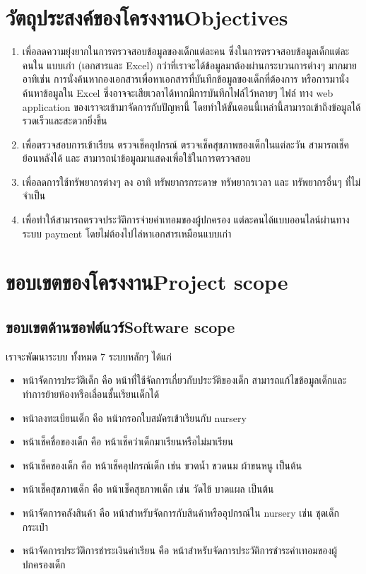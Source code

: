 \section{\ifcpe วัตถุประสงค์ของโครงงาน\else Objectives\fi}
\begin{enumerate}
    \item เพื่อลดความยุ่งยากในการตรวจสอบข้อมูลของเด็กแต่ละคน ซึ่งในการตรวจสอบข้อมูลเด็กแต่ละคนใน แบบเก่า (เอกสารและ Excel) กว่าที่เราจะได้ข้อมูลมาต้องผ่านกระบวนการต่างๆ มากมาย อาทิเช่น การนั่งค้นหากองเอกสารเพื่อหาเอกสารที่บันทึกข้อมูลของเด็กที่ต้องการ หรือการมานั่งค้นหาข้อมูลใน Excel ซึ่งอาจจะเสียเวลาได้หากมีการบันทึกไฟล์ไว้หลายๆ ไฟล์ ทาง web application ของเราจะเข้ามาจัดการกับปัญหานี้ โดยทําให้ขั้นตอนนี้เหล่านี้สามารถเข้าถึงข้อมูลได้รวดเร็วและสะดวกยิ่งขึ้น 

    \item เพื่อตรวจสอบการเข้าเรียน ตรวจเช็คอุปกรณ์ ตรวจเช็คสุขภาพของเด็กในแต่ละวัน   สามารถเช็คย้อนหลังได้ และ สามารถนําข้อมูลมาแสดงเพื่อใช้ในการตรวจสอบ

    \item เพื่อลดการใช้ทรัพยากรต่างๆ ลง อาทิ ทรัพยากรกระดาษ ทรัพยากรเวลา และ ทรัพยากรอื่นๆ ที่ไม่จําเป็น
    \item เพื่อทำให้สามารถตรวจประวัติการจ่ายค่าเทอมของผู้ปกครอง แต่ละคนได้แบบออนไลน์ผ่านทางระบบ payment โดยไม่ต้องไปไล่หาเอกสารเหมือนแบบเก่า

\end{enumerate}


\section{\ifcpe ขอบเขตของโครงงาน\else Project scope\fi}




\subsection{\ifcpe ขอบเขตด้านซอฟต์แวร์\else Software scope\fi}
    เราจะพัฒนาระบบ ทั้งหมด 7 ระบบหลักๆ ได้แก่
    \begin{itemize}
        \item หน้าจัดการประวัติเด็ก คือ หน้าที่ใช้จัดการเกี่ยวกับประวัติของเด็ก สามารถแก้ไขข้อมูลเด็กและทำการย้ายห้องหรือเลื่อนชั้นเรียนเด็กได้
        \item หน้าลงทะเบียนเด็ก คือ หน้ากรอกใบสมัครเข้าเรียนกับ nursery
        \item หน้าเช็คชื่อของเด็ก คือ หน้าเช็คว่าเด็กมาเรียนหรือไม่มาเรียน
        \item หน้าเช็คของเด็ก คือ หน้าเช็คอุปกรณ์เด็ก เช่น ขวดน้ำ ขวดนม ผ้าขนหนู เป็นต้น
        \item หน้าเช็คสุขภาพเด็ก คือ หน้าเช็คสุขภาพเด็ก เช่น วัดไข้ บาดแผล เป็นต้น
        \item หน้าจัดการคลังสินค้า คือ หน้าสำหรับจัดการกับสินค้าหรืออุปกรณ์ใน nursery เช่น ชุดเด็ก กระเป๋า 
        \item หน้าจัดการประวัติการชำระเงินค่าเรียน คือ หน้าสำหรับจัดการประวัติการชำระค่าเทอมของผู้ปกครองเด็ก
    \end{itemize}

